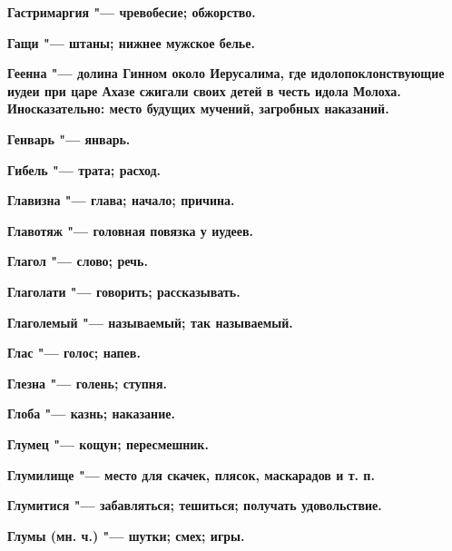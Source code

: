 \begin{mymulticols}{2}
\bfseries Гастримаргия\normalfont{} "--- чревобесие; обжорство. 




\bfseries Гащи\normalfont{} "--- штаны; нижнее мужское белье. 




\bfseries Геенна\normalfont{} "--- долина Гинном около Иерусалима, где идолопоклонствующие иудеи при царе Ахазе сжигали своих детей в честь идола Молоха. Иносказательно: место будущих мучений, загробных наказаний. 




\bfseries Генварь\normalfont{} "--- январь. 




\bfseries Гибель\normalfont{} "--- трата; расход. 




\bfseries Главизна\normalfont{} "--- глава; начало; причина. 




\bfseries Главотяж\normalfont{} "--- головная повязка у иудеев. 




\bfseries Глагол\normalfont{} "--- слово; речь. 




\bfseries Глаголати\normalfont{} "--- говорить; рассказывать. 




\bfseries Глаголемый\normalfont{} "--- называемый; так называемый. 




\bfseries Глас\normalfont{} "--- голос; напев. 




\bfseries Глезна\normalfont{} "--- голень; ступня. 




\bfseries Глоба\normalfont{} "--- казнь; наказание. 




\bfseries Глумец\normalfont{} "--- кощун; пересмешник. 




\bfseries Глумилище\normalfont{} "--- место для скачек, плясок, маскарадов и т. п. 




\bfseries Глумитися\normalfont{} "--- забавляться; тешиться; получать удовольствие. 




\bfseries Глумы\normalfont{} (мн. ч.) "--- шутки; смех; игры. 





\end{mymulticols}
